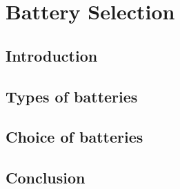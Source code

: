 \chapter{Battery Selection}
\section{Introduction}
\section{Types of batteries}
\section{Choice of batteries}
\section{Conclusion}